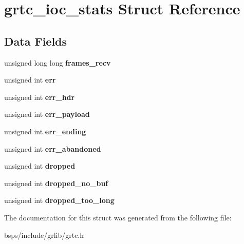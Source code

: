 \hypertarget{structgrtc__ioc__stats}{}\section{grtc\+\_\+ioc\+\_\+stats Struct Reference}
\label{structgrtc__ioc__stats}
\subsection*{Data Fields}
\begin{DoxyCompactItemize}
\item 
\mbox{\label{structgrtc__ioc__stats_a609a3afefc712844ca5542f15f7df7ba}} 
unsigned long long {\bfseries frames\+\_\+recv}
\item 
\mbox{\label{structgrtc__ioc__stats_a55e8e2faf18f8ff89d61bae314885fd5}} 
unsigned int {\bfseries err}
\item 
\mbox{\label{structgrtc__ioc__stats_ae52dc08e80406e3d0fe5ad61b44de472}} 
unsigned int {\bfseries err\+\_\+hdr}
\item 
\mbox{\label{structgrtc__ioc__stats_a498ad8191bd28a73e9ae4809cdb1deb5}} 
unsigned int {\bfseries err\+\_\+payload}
\item 
\mbox{\label{structgrtc__ioc__stats_a9f844b629788688f078b7ecb796329f6}} 
unsigned int {\bfseries err\+\_\+ending}
\item 
\mbox{\label{structgrtc__ioc__stats_a9d254826618d970b2415482389cb88a7}} 
unsigned int {\bfseries err\+\_\+abandoned}
\item 
\mbox{\label{structgrtc__ioc__stats_a5eb7422b0cae7a293d934d1504464409}} 
unsigned int {\bfseries dropped}
\item 
\mbox{\label{structgrtc__ioc__stats_a768cf3d029363c62e2e80fb2fecc9270}} 
unsigned int {\bfseries dropped\+\_\+no\+\_\+buf}
\item 
\mbox{\label{structgrtc__ioc__stats_a30421edec128e57840749dbf3dfd0388}} 
unsigned int {\bfseries dropped\+\_\+too\+\_\+long}
\end{DoxyCompactItemize}


The documentation for this struct was generated from the following file\+:\begin{DoxyCompactItemize}
\item 
bsps/include/grlib/grtc.\+h\end{DoxyCompactItemize}

